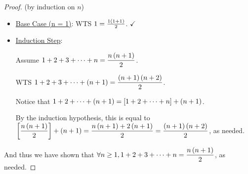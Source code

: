 \begin{proof} (by induction on \(n\)) \(\)
  \begin{itemize}
    \item \underline{Base Case (n = 1)}: WTS \(1 = \frac{1 \left(1 + 1\right)}{2}\). \(\checkmark\)

    \item \underline{Induction Step}:

          Assume \(\displaystyle 1 + 2 + 3 + \cdots + n = \frac{n \left(n + 1\right)}{2}\).

          WTS \(\displaystyle 1 + 2 + 3 + \cdots + \left(n + 1\right) = \frac{\left(n + 1\right) \left(n + 2\right)}{2}\).

          Notice that \(1 + 2 + \cdots + \left(n + 1\right) = \left[1 + 2 + \cdots + n\right] + \left(n + 1\right)\).

          By the induction hypothesis, this is equal to \(\displaystyle \left[\frac{n \left(n + 1\right)}{2}\right] + \left(n + 1\right) = \frac{n \left(n + 1\right) + 2 \left(n + 1\right)}{2} = \frac{\left(n + 1\right) \left(n + 2\right)}{2}\), as needed.
  \end{itemize}

  And thus we have shown that \(\displaystyle \forall n \geq 1, 1 + 2 + 3 + \cdots + n = \frac{n \left(n + 1\right)}{2}\), as needed.
\end{proof}

